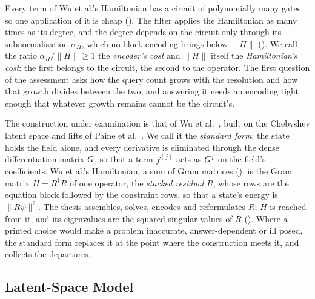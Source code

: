 Every term of Wu et al.'s Hamiltonian has a circuit of polynomially many gates, so one application of it is cheap (). The filter applies the Hamiltonian as many times as its degree, and the degree depends on the circuit only through its subnormalisation $\alpha_H$, which no block encoding brings below $\|H\|$ (). We call the ratio $\alpha_H/\|H\|\ge1$ the \emph{encoder's cost} and $\|H\|$ itself the \emph{Hamiltonian's cost}: the first belongs to the circuit, the second to the operator. The first question of the assessment asks how the query count grows with the resolution and how that growth divides between the two, and answering it needs an encoding tight enough that whatever growth remains cannot be the circuit's.

The construction under examination is that of Wu et al.\ \cite{wu2025pihm}, built on the Chebyshev latent space and lifts of Paine et al.\ \cite{paine2023physicsinformed}. We call it the \emph{standard form}: the state holds the field alone, and every derivative is eliminated through the dense differentiation matrix $G$, so that a term $f^{(j)}$ acts as $G^j$ on the field's coefficients. Wu et al.'s Hamiltonian, a sum of Gram matrices (), is the Gram matrix $H=R^\dagger R$ of one operator, the \emph{stacked residual} $R$, whose rows are the equation block followed by the constraint rows, so that a state's energy is $\|R\psi\|^2$. The thesis assembles, solves, encodes and reformulates $R$; $H$ is reached from it, and its eigenvalues are the squared singular values of $R$ (). Where a printed choice would make a problem inaccurate, answer-dependent or ill posed, the standard form replaces it at the point where the construction meets it, and  collects the departures.

\subsection{Latent-Space Model}
\label{sec:standard-model}

